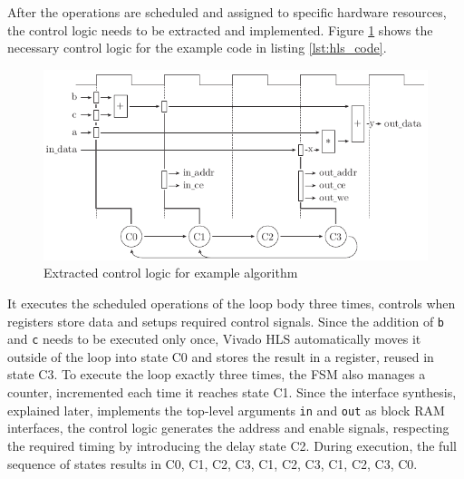 After the operations are scheduled and assigned to specific hardware
resources, the control logic needs to be extracted and implemented. Figure
\ref{fig:hls_c} shows the necessary control logic for the example code in
listing \ref{lst:hls_code}.
\begin{figure}[tb]
	\centering
	\includegraphics{../figures/hls_c}
	\caption{Extracted control logic for example algorithm}
	\label{fig:hls_c}
\end{figure}
It executes the scheduled operations of the loop body three times, controls
when registers store data and setups required control signals. Since the
addition of \lstinline{b} and \lstinline{c} needs to be executed only once,
Vivado \ac{HLS} automatically moves it outside of the loop into state C0 and
stores the result in a register, reused in state C3. To execute the loop
exactly three times, the \ac{FSM} also manages a counter, incremented each
time it reaches state C1. Since the interface synthesis, explained later,
implements the top-level arguments \lstinline{in} and \lstinline{out} as block
\ac{RAM} interfaces, the control logic generates the address and enable
signals, respecting the required timing by introducing the delay state C2.
During execution, the full sequence of states results in C0, C1, C2, C3, C1,
C2, C3, C1, C2, C3, C0.


